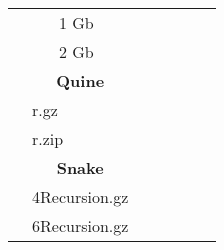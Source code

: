 \documentclass{article}           %
\begin{document}
\begin{table}[]
\begin{tabular}{lllccccc}
\multicolumn{1}{|l|}{}                               & \multicolumn{1}{l|}{}                     & \multicolumn{1}{l|}{1 Gb}   & \multicolumn{1}{c|}{}       & \multicolumn{1}{c|}{}       & \multicolumn{1}{c|}{}           & \multicolumn{1}{c|}{}      & \multicolumn{1}{c|}{}        \\ \cline{3-8} 
\multicolumn{1}{|l|}{}                               & \multicolumn{1}{l|}{}                     & \multicolumn{1}{l|}{2 Gb}   & \multicolumn{1}{c|}{}       & \multicolumn{1}{c|}{}       & \multicolumn{1}{c|}{}           & \multicolumn{1}{c|}{}      & \multicolumn{1}{c|}{}        \\ \cline{2-8} 
\multicolumn{1}{|l|}{}                               & \multicolumn{2}{c|}{\textbf{Quine}}                                     & \multicolumn{5}{c|}{}                                                                                                                                   \\ \cline{2-8} 
\multicolumn{1}{|l|}{}                               & \multicolumn{2}{l|}{r.gz}                                               & \multicolumn{1}{c|}{}       & \multicolumn{1}{c|}{}       & \multicolumn{1}{c|}{}           & \multicolumn{1}{c|}{}      & \multicolumn{1}{c|}{}        \\ \cline{2-8} 
\multicolumn{1}{|l|}{}                               & \multicolumn{2}{l|}{r.zip}                                              & \multicolumn{1}{c|}{}       & \multicolumn{1}{c|}{}       & \multicolumn{1}{c|}{}           & \multicolumn{1}{c|}{}      & \multicolumn{1}{c|}{}        \\ \cline{2-8} 
\multicolumn{1}{|l|}{}                               & \multicolumn{2}{c|}{\textbf{Snake}}                                     & \multicolumn{5}{c|}{}                                                                                                                                   \\ \cline{2-8} 
\multicolumn{1}{|l|}{}                               & \multicolumn{2}{l|}{4Recursion.gz}                                      & \multicolumn{1}{c|}{}       & \multicolumn{1}{c|}{}       & \multicolumn{1}{c|}{}           & \multicolumn{1}{c|}{}      & \multicolumn{1}{c|}{}        \\ \cline{2-8} 
\multicolumn{1}{|l|}{}                               & \multicolumn{2}{l|}{6Recursion.gz}                                      & \multicolumn{5}{l|}{}                                                                                                                                   \\ \cline{2-8} 

\end{tabular}
\end{table}
\end{document}
